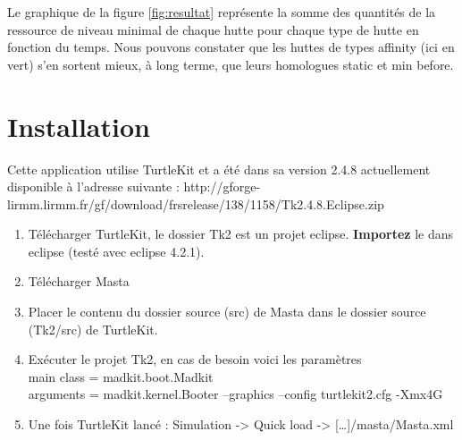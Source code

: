   Le graphique de la figure \vref{fig:resultat} représente la somme des quantités
  de la ressource de niveau minimal de chaque hutte pour chaque type
  de hutte en fonction du temps. Nous pouvons constater que les huttes
  de types \og{}affinity\fg{} (ici en vert) s'en sortent mieux, à long
  terme, que leurs homologues \og{}static\fg{} et \og{}min
  before\fg{}.

\section{Installation}

Cette application utilise TurtleKit et a été dans sa version
2.4.8 actuellement disponible à l'adresse suivante :
http://gforge-lirmm.lirmm.fr/gf/download/frsrelease/138/1158/Tk2.4.8.Eclipse.zip

\begin{enumerate}
\item Télécharger TurtleKit, le dossier Tk2 est un projet
eclipse. {\bf Importez} le dans eclipse (testé avec eclipse 4.2.1).
\item Télécharger Masta
\item Placer le contenu du dossier source (src) de Masta dans le
dossier source (Tk2/src) de TurtleKit.
\item Exécuter le projet Tk2, en cas de besoin voici les paramètres \\
main class = madkit.boot.Madkit \\
arguments = madkit.kernel.Booter --graphics --config turtlekit2.cfg
-Xmx4G \\
\item Une fois TurtleKit lancé : Simulation -> Quick load ->
[\ldots]/masta/Masta.xml
\end{enumerate}
  
